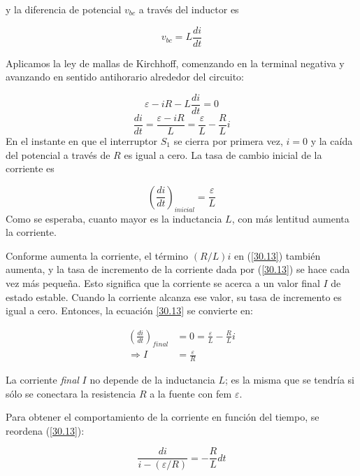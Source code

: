 y la diferencia de potencial $v_{bc}$ a través del inductor es

\begin{equation*}
v_{bc}=L\frac{di}{dt}
\end{equation*}

Aplicamos la ley de mallas de Kirchhoff, comenzando en la terminal negativa y avanzando en sentido antihorario alrededor del circuito:

\begin{equation}\label{30.12}
\varepsilon - iR - L\frac{di}{dt}=0
\end{equation}
\begin{equation}\label{30.13}
\frac{di}{dt}=\frac{\varepsilon -iR}{L}=\frac{\varepsilon}{L}-\frac{R}{L}i
\end{equation}
 En el instante en que el interruptor $S_1$ se cierra por primera vez, $i = 0$ y la caída del potencial a través de $R$ es igual a cero. La tasa de cambio inicial de la corriente es
 
\begin{equation*}
\left(\frac{di}{dt}\right)_{inicial}=\frac{\varepsilon}{L}
\end{equation*}
 Como se esperaba, cuanto mayor es la inductancia $L$, con más lentitud aumenta la corriente.
 
Conforme aumenta la corriente, el término $(R/L)i$ en (\ref{30.13}) también aumenta, y la tasa de incremento de la corriente dada por (\ref{30.13}) se hace cada vez más pequeña. Esto significa que la corriente se acerca a un valor final $I$ de estado estable. Cuando la corriente alcanza ese valor, su tasa de incremento es igual a cero. Entonces, la ecuación \ref{30.13} se convierte en:

\begin{align*}
\left(\frac{di}{dt}\right)_{final}&=0=\frac{\varepsilon}{L}-\frac{R}{L}i \\
\Rightarrow  I&=\frac{\varepsilon}{R}
\end{align*}

La corriente \textit{final} $I$ no depende de la inductancia $L$; es la misma que se tendría si sólo se conectara la resistencia $R$ a la fuente con fem $\varepsilon$.

Para obtener el comportamiento de la corriente en función del tiempo, se reordena (\ref{30.13}):

\begin{equation*}
\frac{di}{i-(\varepsilon /R)}=-\frac{R}{L}dt
\end{equation*}

